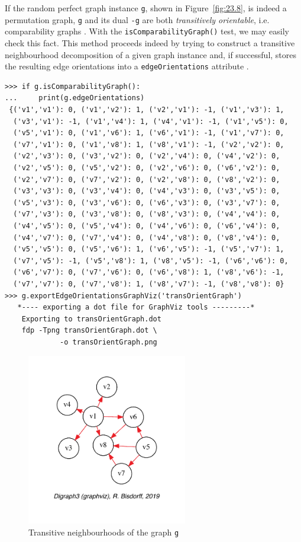 If the random perfect graph instance \texttt{g}, shown in Figure~\vref{fig:23.8}, is indeed a permutation graph, \texttt{g} and its dual \texttt{-g} are both \emph{transitively orientable}, i.e. comparability graphs \citep{GOL-2004}. With the \texttt{isComparabili\-tyGraph()} test, we may easily check this fact. This method proceeds indeed by trying to construct a transitive neighbourhood decomposition of a given graph instance and, if successful, stores the resulting edge orientations into a \texttt{edgeOrien\-tations} attribute \citep[p.129-132]{GOL-2004}.
\begin{lstlisting}[basicstyle=\scriptsize]
>>> if g.isComparabilityGraph():
...     print(g.edgeOrientations)  
 {('v1','v1'): 0, ('v1','v2'): 1, ('v2','v1'): -1, ('v1','v3'): 1,
  ('v3','v1'): -1, ('v1','v4'): 1, ('v4','v1'): -1, ('v1','v5'): 0,
  ('v5','v1'): 0, ('v1','v6'): 1, ('v6','v1'): -1, ('v1','v7'): 0,
  ('v7','v1'): 0, ('v1','v8'): 1, ('v8','v1'): -1, ('v2','v2'): 0,
  ('v2','v3'): 0, ('v3','v2'): 0, ('v2','v4'): 0, ('v4','v2'): 0,
  ('v2','v5'): 0, ('v5','v2'): 0, ('v2','v6'): 0, ('v6','v2'): 0,
  ('v2','v7'): 0, ('v7','v2'): 0, ('v2','v8'): 0, ('v8','v2'): 0,
  ('v3','v3'): 0, ('v3','v4'): 0, ('v4','v3'): 0, ('v3','v5'): 0,
  ('v5','v3'): 0, ('v3','v6'): 0, ('v6','v3'): 0, ('v3','v7'): 0,
  ('v7','v3'): 0, ('v3','v8'): 0, ('v8','v3'): 0, ('v4','v4'): 0,
  ('v4','v5'): 0, ('v5','v4'): 0, ('v4','v6'): 0, ('v6','v4'): 0,
  ('v4','v7'): 0, ('v7','v4'): 0, ('v4','v8'): 0, ('v8','v4'): 0,
  ('v5','v5'): 0, ('v5','v6'): 1, ('v6','v5'): -1, ('v5','v7'): 1,
  ('v7','v5'): -1, ('v5','v8'): 1, ('v8','v5'): -1, ('v6','v6'): 0,
  ('v6','v7'): 0, ('v7','v6'): 0, ('v6','v8'): 1, ('v8','v6'): -1,
  ('v7','v7'): 0, ('v7','v8'): 1, ('v8','v7'): -1, ('v8','v8'): 0}
>>> g.exportEdgeOrientationsGraphViz('transOrientGraph')
   *---- exporting a dot file for GraphViz tools ---------*
    Exporting to transOrientGraph.dot
    fdp -Tpng transOrientGraph.dot \
             -o transOrientGraph.png
\end{lstlisting}		    
\begin{figure}[ht]
\sidecaption[t]
\includegraphics[width=7cm]{Figures/23-9-transOrientGraph.pdf}
\caption[Transitive neighbourhoods of a graph]{Transitive neighbourhoods of the graph \texttt{g}} 
\label{fig:23.9}       %
\end{figure}

